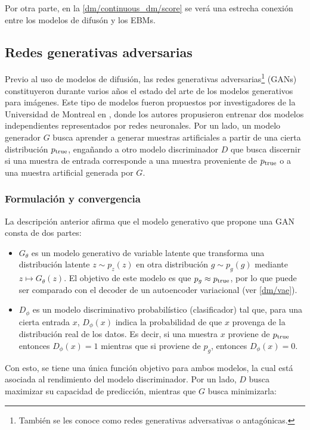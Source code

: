 Por otra parte, en la \autoref{dm/continuous_dm/score} se verá una estrecha conexión entre los modelos de difusón y los EBMs.

\subsection{Redes generativas adversarias}
\label{dm/generative_models/gans}

Previo al uso de modelos de difusión, las redes generativas adversarias\footnote{También se les conoce como redes generativas adversativas o antagónicas.} (GANs) constituyeron durante varios años el estado del arte de los modelos generativos para imágenes. Este tipo de modelos fueron propuestos por investigadores de la Universidad de Montreal en \cite{goodfellow2014generative}, donde los autores propusieron entrenar dos modelos independientes representados por redes neuronales. Por un lado, un modelo generador $G$ busca aprender a generar muestras artificiales a partir de una cierta distribución $p_{\operatorname{true}}$, engañando a otro modelo discriminador $D$ que busca discernir si una muestra de entrada corresponde a una muestra proveniente de $p_{\operatorname{true}}$ o a una muestra artificial generada por $G$.

\subsubsection{Formulación y convergencia}

La descripción anterior afirma que el modelo generativo que propone una GAN consta de dos partes:

\begin{itemize}
    \item $G_\theta$ es un modelo generativo de variable latente que transforma una distribución latente $z\sim p_z(z)$ en otra distribución $g\sim p_g(g)$ mediante $z\mapsto G_\theta(z)$. El objetivo de este modelo es que $p_g\approx p_{\operatorname{true}}$, por lo que puede ser comparado con el decoder de un autoencoder variacional (ver \autoref{dm/vae}).
    \item $D_\phi$ es un modelo discriminativo probabilístico (clasificador) tal que, para una cierta entrada $x$, $D_\phi(x)$ indica la probabilidad de que $x$ provenga de la distribución real de los datos. Es decir, si una muestra $x$ proviene de $p_{\operatorname{true}}$ entonces $D_\phi(x)=1$ mientras que si proviene de $p_g$, entonces $D_\phi(x)=0$. \end{itemize}

Con esto, se tiene una única función objetivo para ambos modelos, la cual está asociada al rendimiento del modelo discriminador. Por un lado, $D$ busca maximizar su capacidad de predicción, mientras que $G$ busca minimizarla:

